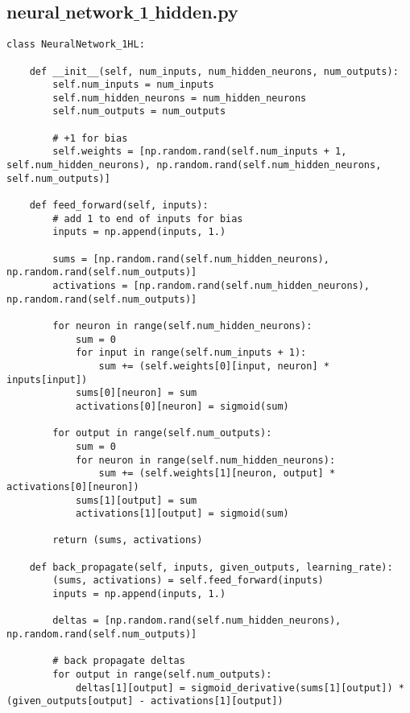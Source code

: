 \documentclass[11pt]{article} %
\begin{document}
\subsection{neural$\_$network$\_$1$\_$hidden.py}

\begin{lstlisting}
class NeuralNetwork_1HL:
    
    def __init__(self, num_inputs, num_hidden_neurons, num_outputs):
        self.num_inputs = num_inputs
        self.num_hidden_neurons = num_hidden_neurons
        self.num_outputs = num_outputs
        
        # +1 for bias
        self.weights = [np.random.rand(self.num_inputs + 1, self.num_hidden_neurons), np.random.rand(self.num_hidden_neurons, self.num_outputs)]
        
    def feed_forward(self, inputs):
        # add 1 to end of inputs for bias
        inputs = np.append(inputs, 1.)
        
        sums = [np.random.rand(self.num_hidden_neurons), np.random.rand(self.num_outputs)]
        activations = [np.random.rand(self.num_hidden_neurons), np.random.rand(self.num_outputs)]
        
        for neuron in range(self.num_hidden_neurons):
            sum = 0
            for input in range(self.num_inputs + 1):
                sum += (self.weights[0][input, neuron] * inputs[input])
            sums[0][neuron] = sum
            activations[0][neuron] = sigmoid(sum)
            
        for output in range(self.num_outputs):
            sum = 0
            for neuron in range(self.num_hidden_neurons):
                sum += (self.weights[1][neuron, output] * activations[0][neuron])
            sums[1][output] = sum
            activations[1][output] = sigmoid(sum)
            
        return (sums, activations)
        
    def back_propagate(self, inputs, given_outputs, learning_rate):
        (sums, activations) = self.feed_forward(inputs)
        inputs = np.append(inputs, 1.)
        
        deltas = [np.random.rand(self.num_hidden_neurons), np.random.rand(self.num_outputs)]
        
        # back propagate deltas
        for output in range(self.num_outputs):
            deltas[1][output] = sigmoid_derivative(sums[1][output]) * (given_outputs[output] - activations[1][output])
            

\end{lstlisting}
\end{document}
